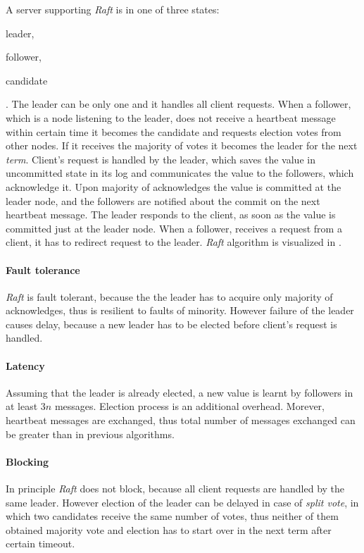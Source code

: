  A server supporting \emph{Raft} is in one of three states: \begin{enumerate*}[label=\alph*)] \item leader, \item follower, \item candidate \end{enumerate*}. The leader can be only one and it handles all client requests.
  When a follower, which is a node listening to the leader, does not receive a heartbeat message within certain time it becomes the candidate and requests election votes from other nodes. If it receives the majority of votes it becomes the leader for the next \emph{term}. Client's request is handled by the leader, which saves the value in uncommitted state in its log and communicates the value to the followers, which acknowledge it. Upon majority of acknowledges the value is committed at the leader node, and the followers are notified about the commit on the next heartbeat message. The leader responds to the client, as soon as the value is committed just at the leader node. When a follower, receives a request from a client, it has to redirect request to the leader. \emph{Raft} algorithm is visualized in \cite{raftVisual}.

\paragraph{Fault tolerance} \emph{Raft} is fault tolerant, because the the leader has to acquire only majority of acknowledges, thus is resilient to faults of minority. However failure of the leader causes delay, because a new leader has to be elected before client's request is handled.

\paragraph{Latency} Assuming that the leader is already elected, a new value is learnt by followers in at least $3n$ messages. Election process is an additional overhead. Morever, heartbeat messages are exchanged, thus total number of messages exchanged can be greater than in previous algorithms.

\paragraph{Blocking} In principle \emph{Raft} does not block, because all client requests are handled by the same leader. However election of the leader can be delayed in case of \emph{split vote}, in which two candidates receive the same number of votes, thus neither of them obtained majority vote and election has to start over in the next term after certain timeout.


